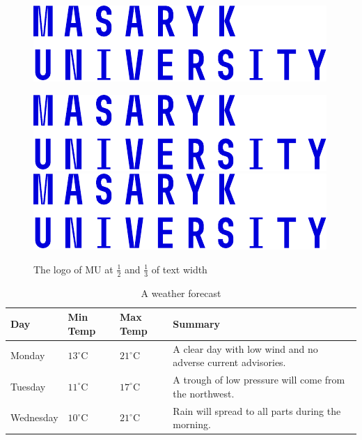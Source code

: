 \documentclass[
  digital,     %
  oneside,     %
  nosansbold,  %
  nocolorbold, %
  lof,         %
  lot,         %
]{fithesis4}
\begin{document}
\begin{figure}
  \begin{center}
    \begin{minipage}{.5\textwidth}
      \includegraphics[width=\textwidth]{fithesis/logo/mu/fithesis-base-english-color}
    \end{minipage}
    \hfill  %
    \begin{minipage}{.33\textwidth}
      \includegraphics[width=\textwidth]{fithesis/logo/mu/fithesis-base-english-color} \\[1em]
      \includegraphics[width=\textwidth]{fithesis/logo/mu/fithesis-base-english-color}
    \end{minipage}
  \end{center}
\caption{The logo of \acrlong{MU} at $\frac12$ and
    $\frac13$ of text width}
  \label{fig:mulogo2}
\end{figure}

\begin{table}
  \begin{tabularx}{\textwidth}{lllX}
    \toprule
    Day & Min Temp & Max Temp & Summary \\
    \midrule
    Monday & $13^{\circ}\mathrm{C}$ & $21^\circ\mathrm{C}$ & A
    clear day with low wind and no adverse current advisories. \\
    Tuesday & $11^{\circ}\mathrm{C}$ & $17^\circ\mathrm{C}$ & A
    trough of low pressure will come from the northwest. \\
    Wednesday & $10^{\circ}\mathrm{C}$ &
    $21^\circ\mathrm{C}$ & Rain will spread to all parts during the
    morning. \\
    \bottomrule
  \end{tabularx}
  \caption{A weather forecast}
  \label{tab:weather}
\end{table}
\end{document}
